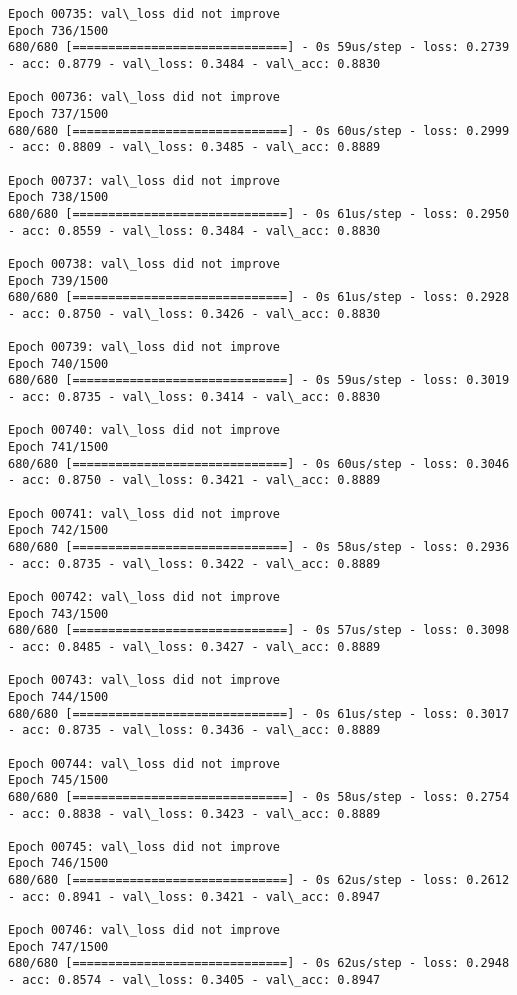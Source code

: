 \documentclass[11pt]{article}
\begin{document}
\begin{Verbatim}[commandchars=\\\{\}]
Epoch 00735: val\_loss did not improve
Epoch 736/1500
680/680 [==============================] - 0s 59us/step - loss: 0.2739 - acc: 0.8779 - val\_loss: 0.3484 - val\_acc: 0.8830

Epoch 00736: val\_loss did not improve
Epoch 737/1500
680/680 [==============================] - 0s 60us/step - loss: 0.2999 - acc: 0.8809 - val\_loss: 0.3485 - val\_acc: 0.8889

Epoch 00737: val\_loss did not improve
Epoch 738/1500
680/680 [==============================] - 0s 61us/step - loss: 0.2950 - acc: 0.8559 - val\_loss: 0.3484 - val\_acc: 0.8830

Epoch 00738: val\_loss did not improve
Epoch 739/1500
680/680 [==============================] - 0s 61us/step - loss: 0.2928 - acc: 0.8750 - val\_loss: 0.3426 - val\_acc: 0.8830

Epoch 00739: val\_loss did not improve
Epoch 740/1500
680/680 [==============================] - 0s 59us/step - loss: 0.3019 - acc: 0.8735 - val\_loss: 0.3414 - val\_acc: 0.8830

Epoch 00740: val\_loss did not improve
Epoch 741/1500
680/680 [==============================] - 0s 60us/step - loss: 0.3046 - acc: 0.8750 - val\_loss: 0.3421 - val\_acc: 0.8889

Epoch 00741: val\_loss did not improve
Epoch 742/1500
680/680 [==============================] - 0s 58us/step - loss: 0.2936 - acc: 0.8735 - val\_loss: 0.3422 - val\_acc: 0.8889

Epoch 00742: val\_loss did not improve
Epoch 743/1500
680/680 [==============================] - 0s 57us/step - loss: 0.3098 - acc: 0.8485 - val\_loss: 0.3427 - val\_acc: 0.8889

Epoch 00743: val\_loss did not improve
Epoch 744/1500
680/680 [==============================] - 0s 61us/step - loss: 0.3017 - acc: 0.8735 - val\_loss: 0.3436 - val\_acc: 0.8889

Epoch 00744: val\_loss did not improve
Epoch 745/1500
680/680 [==============================] - 0s 58us/step - loss: 0.2754 - acc: 0.8838 - val\_loss: 0.3423 - val\_acc: 0.8889

Epoch 00745: val\_loss did not improve
Epoch 746/1500
680/680 [==============================] - 0s 62us/step - loss: 0.2612 - acc: 0.8941 - val\_loss: 0.3421 - val\_acc: 0.8947

Epoch 00746: val\_loss did not improve
Epoch 747/1500
680/680 [==============================] - 0s 62us/step - loss: 0.2948 - acc: 0.8574 - val\_loss: 0.3405 - val\_acc: 0.8947


\end{Verbatim}
\end{document}
